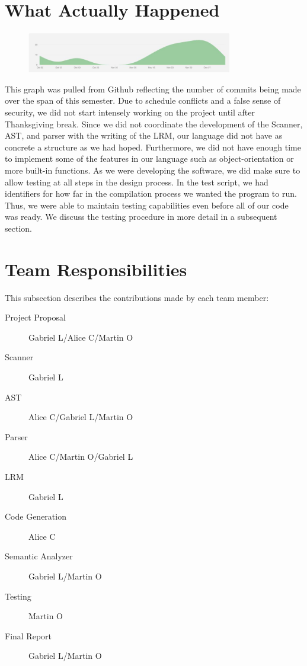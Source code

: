\documentclass[11pt]{report}
\begin{document}
\section{What Actually Happened}
\begin{figure}[h]
 \centering
 \includegraphics[width=0.8\textwidth]{Github_Graph}
\end{figure}
This graph was pulled from Github reflecting the number of commits being made over the span of this semester. Due to schedule conflicts and a false sense of security, we did not start intensely working on the project until after Thanksgiving break. Since we did not coordinate the development of the Scanner, AST, and parser with the writing of the LRM, our language did not have as concrete a structure as we had hoped. Furthermore, we did not have enough time to implement some of the features in our language such as object-orientation or more built-in functions. As we were developing the software, we did make sure to allow testing at all steps in the design process. In the test script, we had identifiers for how far in the compilation process we wanted the program to run. Thus, we were able to maintain testing capabilities even before all of our code was ready. We discuss the testing procedure in more detail in a subsequent section. 
\section{Team Responsibilities}
This subsection describes the contributions made by each team member:
\begin{description}
\item[Project Proposal] Gabriel L/Alice C/Martin O
\item[Scanner] Gabriel L
\item[AST] Alice C/Gabriel L/Martin O
\item[Parser] Alice C/Martin O/Gabriel L
\item[LRM] Gabriel L
\item[Code Generation] Alice C
\item[Semantic Analyzer] Gabriel L/Martin O
\item[Testing] Martin O 
\item[Final Report] Gabriel L/Martin O
\end{description}
\end{document}
